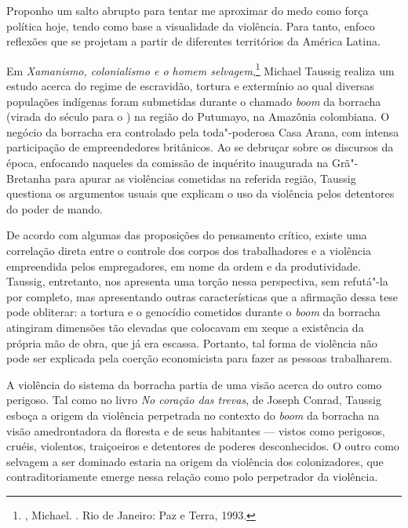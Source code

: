 \asterisc

Proponho um salto abrupto para tentar me aproximar do medo como força política hoje,
tendo como base a visualidade da violência. Para tanto, enfoco reflexões
que se projetam a partir de diferentes territórios da América Latina.

Em \emph{Xamanismo, colonialismo e o homem selvagem},\footnote{, Michael. {}. Rio de Janeiro: Paz e Terra, 1993.} Michael Taussig
realiza um estudo acerca do regime de escravidão, tortura e extermínio
ao qual diversas populações indígenas foram submetidas durante o chamado
\emph{boom} da borracha (virada do século  para o ) na região do
Putumayo, na Amazônia
colombiana. O negócio da borracha era controlado pela toda"-poderosa Casa Arana, com intensa participação de empreendedores britânicos. Ao se
debruçar sobre os discursos da época, enfocando naqueles da comissão de
inquérito inaugurada na Grã"-Bretanha para apurar as violências cometidas
na referida região, Taussig questiona os argumentos usuais que explicam
o uso da violência pelos detentores do poder de mando.


De acordo com algumas das proposições do pensamento crítico,
existe uma correlação direta entre o controle dos corpos dos
trabalhadores e a violência empreendida pelos empregadores, em nome da
ordem e da produtividade. Taussig, entretanto, nos apresenta uma torção
nessa perspectiva, sem refutá"-la por completo, mas
apresentando outras características que a afirmação dessa tese pode obliterar:
a tortura e o genocídio cometidos durante o \emph{boom} da borracha
atingiram dimensões tão elevadas que colocavam em xeque a existência da
própria mão de obra, que já era escassa. Portanto, tal forma de violência não pode ser explicada pela coerção economicista para fazer as pessoas trabalharem.

A violência do sistema da borracha partia de uma visão acerca do outro como perigoso. Tal como no livro \emph{No coração das trevas}, de Joseph Conrad, Taussig esboça a
origem da violência perpetrada no contexto do \emph{boom} da borracha na
visão amedrontadora da floresta e de seus habitantes --- vistos como
perigosos, cruéis, violentos, traiçoeiros e detentores de poderes
desconhecidos. O outro como selvagem a ser dominado estaria na origem da
violência dos colonizadores, que contraditoriamente emerge nessa relação
como polo perpetrador da violência.

